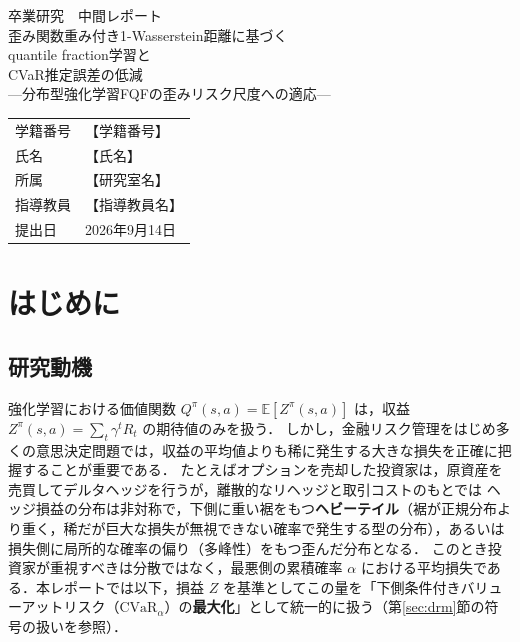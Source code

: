 \documentclass[a4paper,10pt]{jsarticle}
\title{\vspace{-1cm}}
\author{}
\date{}
\theoremstyle{definition}
\newcommand{\CVaR}{\mathrm{CVaR}}
\newcommand{\E}{\mathbb{E}}
\begin{document}
\begin{titlepage}
\begin{center}
\vspace*{3cm}
{\LARGE 卒業研究　中間レポート}\\[1.5cm]
{\Large 歪み関数重み付き1-Wasserstein距離に基づく\\[0.3cm]
quantile fraction学習と\\[0.3cm]
CVaR推定誤差の低減}\\[0.6cm]
{\large ---分布型強化学習FQFの歪みリスク尺度への適応---}\\[3cm]

\begin{tabular}{ll}
学籍番号 & 【学籍番号】\\[0.3cm]
氏名 & 【氏名】\\[0.3cm]
所属 & 【研究室名】\\[0.3cm]
指導教員 & 【指導教員名】\\[0.3cm]
提出日 & 2026年9月14日\\
\end{tabular}
\vfill
\end{center}
\end{titlepage}

\tableofcontents
\newpage

\section{はじめに}
\label{sec:intro}

\subsection{研究動機}
強化学習における価値関数 $Q^\pi(s,a)=\E[Z^\pi(s,a)]$ は，収益 $Z^\pi(s,a)=\sum_t\gamma^t R_t$ の期待値のみを扱う．
しかし，金融リスク管理をはじめ多くの意思決定問題では，収益の平均値よりも稀に発生する大きな損失を正確に把握することが重要である．
たとえばオプションを売却した投資家は，原資産を売買してデルタヘッジを行うが，離散的なリヘッジと取引コストのもとでは
ヘッジ損益の分布は非対称で，下側に重い裾をもつ\textbf{ヘビーテイル}（裾が正規分布より重く，稀だが巨大な損失が無視できない確率で発生する型の分布），あるいは損失側に局所的な確率の偏り（多峰性）をもつ歪んだ分布となる．
このとき投資家が重視すべきは分散ではなく，最悪側の累積確率 $\alpha$ における平均損失である．本レポートでは以下，損益 $Z$ を基準としてこの量を「下側条件付きバリューアットリスク（$\CVaR_\alpha$）の\textbf{最大化}」として統一的に扱う（第\ref{sec:drm}節の符号の扱いを参照）\cite{rockafellar2000cvar}．
\end{document}
